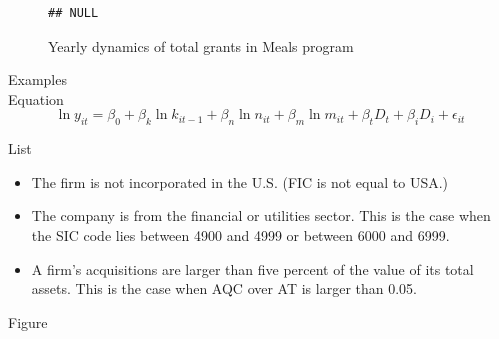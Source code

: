 \documentclass[12pt, a4paper]{article}\usepackage[]{graphicx}\usepackage[]{color}
\makeatletter
\newenvironment{kframe}{%
 \def\at@end@of@kframe{}%
 \ifinner\ifhmode%
  \def\at@end@of@kframe{\end{minipage}}%
  \begin{minipage}{\columnwidth}%
 \fi\fi%
 \def\FrameCommand##1{\hskip\@totalleftmargin \hskip-\fboxsep
 \colorbox{shadecolor}{##1}\hskip-\fboxsep
     \hskip-\linewidth \hskip-\@totalleftmargin \hskip\columnwidth}%
 \MakeFramed {\advance\hsize-\width
   \@totalleftmargin\z@ \linewidth\hsize
   \@setminipage}}%
 {\par\unskip\endMakeFramed%
 \at@end@of@kframe}
\newenvironment{knitrout}{}{} %
\makeatother
\begin{document}
\begin{figure}
  \caption{Yearly dynamics of total grants in Meals program}
  \label{totalGrantsDyn}

\begin{knitrout}
\color{fgcolor}\begin{kframe}
\begin{verbatim}
## NULL
\end{verbatim}
\end{kframe}
\end{knitrout}

\end{figure}




Examples\\

Equation\\

\begin{equation}
\label{ModelProdu}
\ln y_{it} = \beta_0 + \beta_k \ln k_{it-1} + \beta_n \ln n_{it} + \beta_m \ln m_{it} + \beta_t D_t + \beta_i D_i + \epsilon_{it}
\end{equation}

List\\

\begin{itemize}
  \item{The firm is not incorporated in the U.S. (FIC is not equal to USA.)}
  \item{The company is from the financial or utilities sector. This is the case when the SIC code lies between 4900 and 4999 or between 6000 and 6999.}
  \item{A firm's acquisitions are larger than five percent of the value of its total assets. This is the case when AQC over AT is larger than 0.05.} 
\end{itemize}


Figure\\
\end{document}
